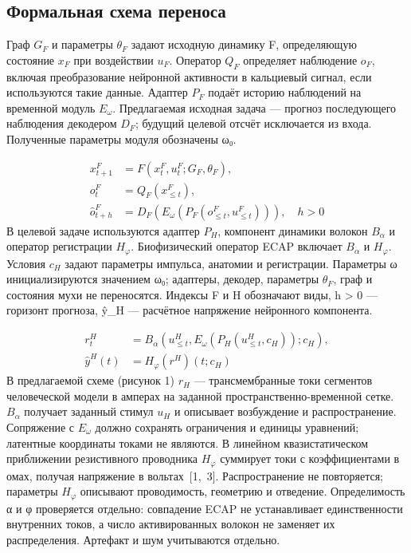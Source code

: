 \documentclass[12pt,a4paper]{article}
\begin{document}
\subsection*{Формальная схема переноса}
Граф \ensuremath{G_{F}} и параметры \ensuremath{θ_{F}} задают исходную динамику F, определяющую состояние \ensuremath{x_{F}} при воздействии \ensuremath{u_{F}}. Оператор \ensuremath{Q_{F}} определяет наблюдение \ensuremath{o_{F}}, включая преобразование нейронной активности в кальциевый сигнал, если используются такие данные. Адаптер \ensuremath{P_{F}} подаёт историю наблюдений на временной модуль \ensuremath{E_{\omega}}. Предлагаемая исходная задача — прогноз последующего наблюдения декодером \ensuremath{D_{F}}; будущий целевой отсчёт исключается из входа. Полученные параметры модуля обозначены ω₀.\par
\[\begin{aligned}x^F_{t+1}&=F(x^F_t,u^F_t;G_F,\theta_F),\\o^F_t&=Q_F(x^F_{\leq t}),\\\widehat o^F_{t+h}&=D_F\!\left(E_\omega(P_F(o^F_{\leq t},u^F_{\leq t}))\right),\quad h>0\end{aligned}\]
В целевой задаче используются адаптер \ensuremath{P_{H}}, компонент динамики волокон \ensuremath{B_{\alpha}} и оператор регистрации \ensuremath{H_{\varphi}}. Биофизический оператор ECAP включает \ensuremath{B_{\alpha}} и \ensuremath{H_{\varphi}}. Условия \ensuremath{c_{H}} задают параметры импульса, анатомии и регистрации. Параметры ω инициализируются значением ω₀; адаптеры, декодер, параметры \ensuremath{θ_{F}}, граф и состояния мухи не переносятся. Индексы F и H обозначают виды, h > 0 — горизонт прогноза, ŷ\_H — расчётное напряжение нейронного компонента.\par
\[\begin{aligned}r^H_t&=B_\alpha\!\left(u^H_{\leq t},E_\omega(P_H(u^H_{\leq t},c_H));c_H\right),\\\widehat y^H(t)&=H_\varphi(r^H)(t;c_H)\end{aligned}\]
В предлагаемой схеме (рисунок 1) \ensuremath{r_{H}} — трансмембранные токи сегментов человеческой модели в амперах на заданной пространственно-временной сетке. \ensuremath{B_{\alpha}} получает заданный стимул \ensuremath{u_{H}} и описывает возбуждение и распространение. Сопряжение с \ensuremath{E_{\omega}} должно сохранять ограничения и единицы уравнений; латентные координаты токами не являются. В линейном квазистатическом приближении резистивного проводника \ensuremath{H_{\varphi}} суммирует токи с коэффициентами в омах, получая напряжение в вольтах~\mbox{[1, 3]}. Распространение не повторяется; параметры \ensuremath{H_{\varphi}} описывают проводимость, геометрию и отведение. Определимость α и φ проверяется отдельно: совпадение ECAP не устанавливает единственности внутренних токов, а число активированных волокон не заменяет их распределения. Артефакт и шум учитываются отдельно.\par
\end{document}
